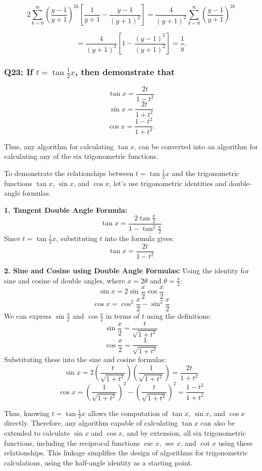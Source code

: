 \documentclass[8pt]{article}
\begin{document}
\[
2 \sum_{k=0}^{\infty} \left(\frac{y - 1}{y + 1}\right)^{2k} \left[ \frac{1}{y + 1} - \frac{y - 1}{(y + 1)^2} \right] = \frac{4}{(y + 1)^2} \sum_{k=0}^{\infty} \left(\frac{y - 1}{y + 1}\right)^{2k}
\]

\[
= \frac{4}{(y + 1)^2} \left[ 1 - \frac{(y - 1)^2}{(y + 1)^2} \right] = \frac{1}{y}.
\]

\subsubsection*{Q23: If \( t = \tan \frac{1}{2} x \), then demonstrate that}
\[
\tan x = \frac{2t}{1 - t^2}
\]
\[
\sin x = \frac{2t}{1 + t^2}
\]
\[
\cos x = \frac{1 - t^2}{1 + t^2}.
\]

Thus, any algorithm for calculating \(\tan x\), can be converted into an algorithm for calculating any of the six trigonometric functions.

To demonstrate the relationships between \( t = \tan \frac{1}{2} x \) and the trigonometric functions \(\tan x\), \(\sin x\), and \(\cos x\), let's use trigonometric identities and double-angle formulas.

\textbf{1. Tangent Double Angle Formula:}
   \[
   \tan x = \frac{2 \tan \frac{x}{2}}{1 - \tan^2 \frac{x}{2}}
   \]
   Since \( t = \tan \frac{1}{2} x \), substituting \( t \) into the formula gives:
   \[
   \tan x = \frac{2t}{1 - t^2}
   \]

\textbf{2. Sine and Cosine using Double Angle Formulas:}
   Using the identity for sine and cosine of double angles, where \( x = 2 \theta \) and \( \theta = \frac{x}{2} \):
   \[
   \sin x = 2 \sin \frac{x}{2} \cos \frac{x}{2}
   \]
   \[
   \cos x = \cos^2 \frac{x}{2} - \sin^2 \frac{x}{2}
   \]
   We can express \(\sin \frac{x}{2}\) and \(\cos \frac{x}{2}\) in terms of \( t \) using the definitions:
   \[
   \sin \frac{x}{2} = \frac{t}{\sqrt{1 + t^2}}
   \]
   \[
   \cos \frac{x}{2} = \frac{1}{\sqrt{1 + t^2}}
   \]
   Substituting these into the sine and cosine formulas:
   \[
   \sin x = 2 \left(\frac{t}{\sqrt{1 + t^2}}\right) \left(\frac{1}{\sqrt{1 + t^2}}\right) = \frac{2t}{1 + t^2}
   \]
   \[
   \cos x = \left(\frac{1}{\sqrt{1 + t^2}}\right)^2 - \left(\frac{t}{\sqrt{1 + t^2}}\right)^2 = \frac{1 - t^2}{1 + t^2}
   \]

Thus, knowing \( t = \tan \frac{1}{2} x \) allows the computation of \(\tan x\), \(\sin x\), and \(\cos x\) directly. Therefore, any algorithm capable of calculating \(\tan x\) can also be extended to calculate \(\sin x\) and \(\cos x\), and by extension, all six trigonometric functions, including the reciprocal functions \( \csc x \), \( \sec x \), and \( \cot x \) using these relationships. This linkage simplifies the design of algorithms for trigonometric calculations, using the half-angle identity as a starting point.
\end{document}
